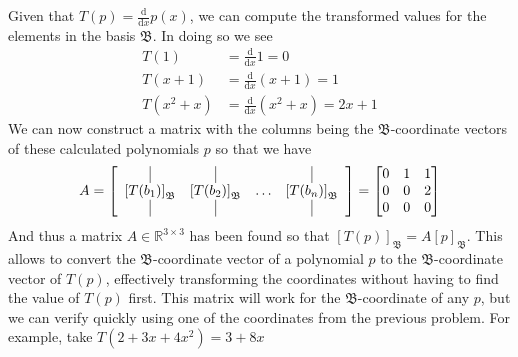 \documentclass{report}
\begin{document}
\sol Given that $T(p) = \frac{\mathrm{d}}{\mathrm{d}x}p(x)$,  we can compute the transformed values for the elements in the basis $\mathfrak{B}$.  In doing so we see
$$
\begin{aligned}
T(1) & = \frac{\mathrm{d}}{\mathrm{d} x}1 = 0 \\
T(x+1) & = \frac{\mathrm{d}}{\mathrm{d} x}(x+1) = 1 \\
T(x^2 + x) & = \frac{\mathrm{d}}{\mathrm{d} x}(x^2+x) = 2x+1
\end{aligned}
$$
We can now construct a matrix with the columns being the $\mathfrak{B}$-coordinate vectors of these calculated polynomials $p$ so that we have
$$
A = \left[
  \begin{array}{cccc}
    \vrule & \vrule & & \vrule\\
    \left[T(b_{1})\right]_{\mathfrak{B}} & \left[T(b_{2})\right]_{\mathfrak{B}} & \ldots & \left[T(b_{n})\right]_{\mathfrak{B}} \\
    \vrule & \vrule & & \vrule 
  \end{array}
\right] =
\begin{bmatrix}
0 & 1 & 1 \\
0 & 0 & 2 \\
0 & 0 & 0
\end{bmatrix}
$$
And thus a matrix $A\in\mathbb{R}^{3\times3}$ has been found so that $[T(p)]_{\mathfrak{B}}=A[p]_{\mathfrak{B}}$.  This allows to convert the $\mathfrak{B}$-coordinate vector of a polynomial $p$ to the $\mathfrak{B}$-coordinate vector of $T(p)$,  effectively transforming the coordinates without having to find the value of $T(p)$ first.  This matrix will work for the $\mathfrak{B}$-coordinate of any $p$,  but we can verify quickly using one of the coordinates from the previous problem.  For example,  take $T(2 + 3x +4x^2) = 3 + 8x$
\end{document}
